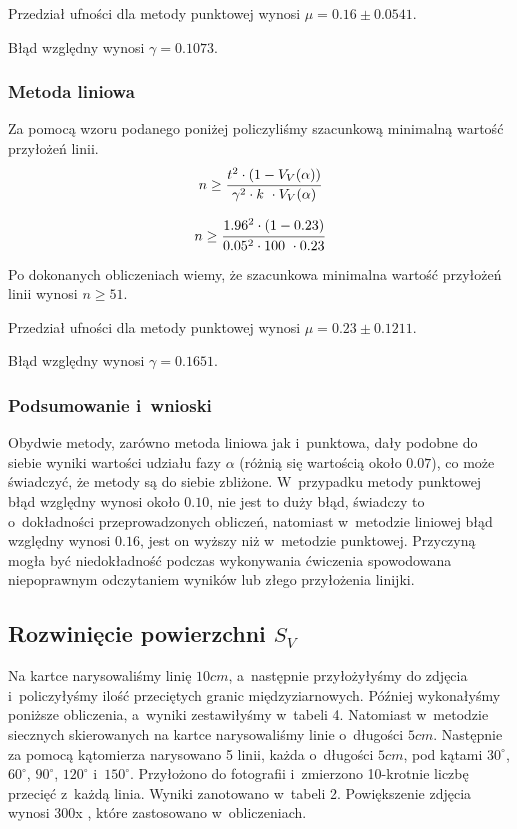 \documentclass[a4paper,12pt]{article}
\begin{document}


Przedział ufności dla metody punktowej wynosi $\mu=0.16\pm 0.0541$.

Błąd względny wynosi $\gamma=0.1073$.
\newpage

\subsubsection{Metoda liniowa}

{\color{blue} Za pomocą wzoru podanego poniżej policzyliśmy szacunkową minimalną wartość przyłożeń linii.
$$n\ge \cfrac{t^2 \cdot (1-V_V(\alpha))}{\gamma^2 \cdot k~\cdot V_V(\alpha)}$$

$$n\ge \cfrac{1.96^2 \cdot (1-0.23)}{0.05^2 \cdot 100~\cdot 0.23}$$
}

Po dokonanych obliczeniach wiemy, że szacunkowa minimalna wartość przyłożeń linii wynosi $n\ge 51$.



Przedział ufności dla metody punktowej wynosi $\mu=0.23\pm 0.1211$.

Błąd względny wynosi $\gamma=0.1651$.
\newpage

{\color{purple}
\subsubsection{Podsumowanie i~wnioski}



Obydwie metody, zarówno metoda liniowa jak i~punktowa, dały podobne  do siebie wyniki wartości udziału fazy $\alpha$ (różnią się wartością około $0.07$), co może świadczyć, że metody są do siebie zbliżone. W~przypadku metody punktowej błąd względny wynosi  około $0.10$, nie jest to duży błąd, świadczy to  o~dokładności przeprowadzonych obliczeń, natomiast w~metodzie liniowej błąd względny wynosi  $0.16$, jest on wyższy niż w~metodzie punktowej. Przyczyną mogła być niedokładność  podczas wykonywania  ćwiczenia spowodowana niepoprawnym odczytaniem wyników lub złego przyłożenia linijki.}
\newpage

\subsection{Rozwinięcie powierzchni $S_V$}

Na kartce narysowaliśmy linię $10cm$, a~następnie przyłożyłyśmy do zdjęcia i~policzyłyśmy ilość przeciętych granic międzyziarnowych. Później wykonałyśmy poniższe obliczenia, a~wyniki zestawiłyśmy w~tabeli 4.  Natomiast w~metodzie siecznych skierowanych na kartce narysowaliśmy linie o~długości $5cm$. Następnie za pomocą kątomierza narysowano 5 linii, każda o~długości $5cm$, pod kątami $30^\circ$, $60^\circ$, $90^\circ$, $120^\circ$ i~$150^\circ$. Przyłożono do fotografii i~zmierzono 10-krotnie liczbę przecięć z~każdą linia. Wyniki zanotowano w~tabeli 2.
Powiększenie zdjęcia  wynosi 300x , które zastosowano w~obliczeniach.
\newline
\end{document}
